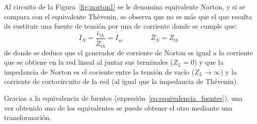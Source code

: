 Al circuito de la Figura~\ref{fig:norton1} se le denomina
equivalente Norton, y si se compara con el equivalente Thévenin, se
observa que no es más que el que resulta de sustituir una fuente de
tensión por una de corriente donde se cumple que:
\begin{equation}
  \boxed{\overline{I}_N=\dfrac{\overline{\epsilon}_{th}}{\overline{Z}_{th}}= I_{sc}} \qquad\qquad \boxed{\overline{Z}_N=\overline{Z}_{th}}
\end{equation}
de donde se deduce que el generador de corriente de Norton es igual a
la corriente que se obtiene en la red lineal al juntar sus terminales
($Z_L=0$) y que la impedancia de Norton es el cociente entre la
tensión de vacío ($Z_L \to \infty$) y la corriente de cortocircuito de la
red (al igual que la impedancia de Thévenin).
\begin{remark}
  Gracias a la equivalencia de fuentes
  (expresión~\eqref{eq:equivalencia_fuentes}), una vez obtenido uno de
  los equivalentes se puede obtener el otro mediante una
  transformación.
\end{remark}

